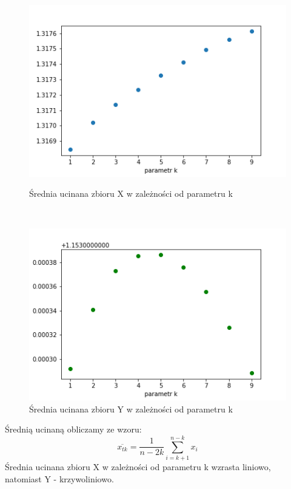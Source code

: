 \documentclass[12pt]{mwart}
\begin{document}
\begin{figure}[H]
	\begin{minipage}{.5\linewidth}
		\centering
		\includegraphics[scale=0.7]{X_trim.PNG}
		\caption{Średnia ucinana zbioru X w zależności od parametru k}
	\end{minipage}
	$\quad$
	\begin{minipage}{.5\linewidth}
		\centering
		\includegraphics[scale=0.7]{Y_trim.PNG}
		\caption{Średnia ucinana zbioru Y w zależności od parametru k}
	\end{minipage}
\end{figure}
\noindent Średnią ucinaną obliczamy ze wzoru: 
\begin{equation}
	\overline{x_{tk}} = \frac{1}{n-2k}\sum\limits_{i=k+1}^{n-k} x_i
\end{equation}
Średnia ucinana zbioru X w zależności od parametru k wzrasta liniowo, natomiast Y - krzywoliniowo.
\end{document}
